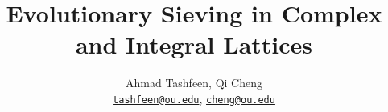 \author{\texorpdfstring{%
    Ahmad Tashfeen, Qi Cheng\\
    \href{mailto://tashfeen@ou.edu}{\texttt{tashfeen@ou.edu}}, %
    \href{mailto://cheng@ou.edu}{\texttt{cheng@ou.edu}}%
  }{%
    Ahmad Tashfeen, Qi Cheng%
  }
}

\title{%
  Evolutionary Sieving in Complex and Integral Lattices
}
\address{Computer Science, %
  Gallogly College of Engineering, %
  University of Oklahoma%
}
\usepackage[plain]{algorithm}
\usepackage{blindtext}
\usepackage{etoolbox}
\apptocmd{\sloppy}{\hbadness 10000\relax}{}{}
\geometry{margin=1in}
\graphicspath{{./media/}}

\makeatletter
\renewcommand{\maketitle} {%
  \begin{center}\unskip%
    \textbf{\large\@title}\par%
    \noindent\@author\par%
    \noindent Computer Science, University of Oklahoma%
  \end{center}%
  \box\abstractbox%
}%
\makeatother

